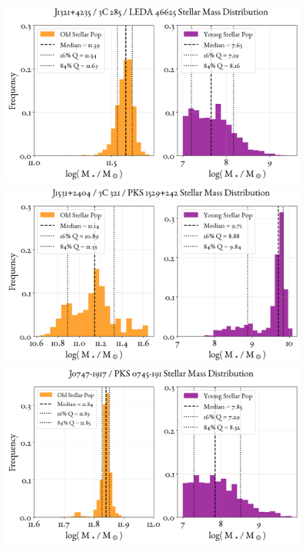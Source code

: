 \begin{figure}
    \centering
    \includegraphics[width=0.8\linewidth]{figures/ResultMasses/105_MassDistri_5306.png}\\
    \includegraphics[width=0.8\linewidth]{figures/ResultMasses/108_MassDistri_5314.png}\\
    \includegraphics[width=0.8\linewidth]{figures/ResultMasses/109_MassDistri_5317.png}    
\end{figure}
